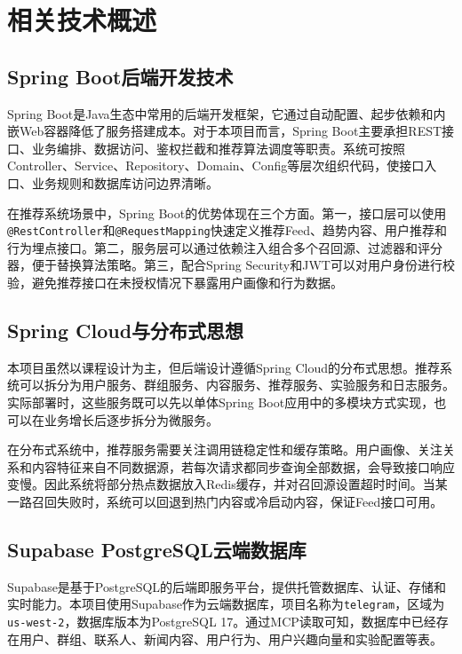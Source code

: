 
\chapter{相关技术概述}

\section{Spring Boot后端开发技术}

Spring Boot是Java生态中常用的后端开发框架，它通过自动配置、起步依赖和内嵌Web容器降低了服务搭建成本。对于本项目而言，Spring Boot主要承担REST接口、业务编排、数据访问、鉴权拦截和推荐算法调度等职责。系统可按照Controller、Service、Repository、Domain、Config等层次组织代码，使接口入口、业务规则和数据库访问边界清晰。

在推荐系统场景中，Spring Boot的优势体现在三个方面。第一，接口层可以使用\texttt{@RestController}和\texttt{@RequestMapping}快速定义推荐Feed、趋势内容、用户推荐和行为埋点接口。第二，服务层可以通过依赖注入组合多个召回源、过滤器和评分器，便于替换算法策略。第三，配合Spring Security和JWT可以对用户身份进行校验，避免推荐接口在未授权情况下暴露用户画像和行为数据。

\section{Spring Cloud与分布式思想}

本项目虽然以课程设计为主，但后端设计遵循Spring Cloud的分布式思想。推荐系统可以拆分为用户服务、群组服务、内容服务、推荐服务、实验服务和日志服务。实际部署时，这些服务既可以先以单体Spring Boot应用中的多模块方式实现，也可以在业务增长后逐步拆分为微服务。

在分布式系统中，推荐服务需要关注调用链稳定性和缓存策略。用户画像、关注关系和内容特征来自不同数据源，若每次请求都同步查询全部数据，会导致接口响应变慢。因此系统将部分热点数据放入Redis缓存，并对召回源设置超时时间。当某一路召回失败时，系统可以回退到热门内容或冷启动内容，保证Feed接口可用。

\section{Supabase PostgreSQL云端数据库}

Supabase是基于PostgreSQL的后端即服务平台，提供托管数据库、认证、存储和实时能力。本项目使用Supabase作为云端数据库，项目名称为\texttt{telegram}，区域为\texttt{us-west-2}，数据库版本为PostgreSQL 17。通过MCP读取可知，数据库中已经存在用户、群组、联系人、新闻内容、用户行为、用户兴趣向量和实验配置等表。

